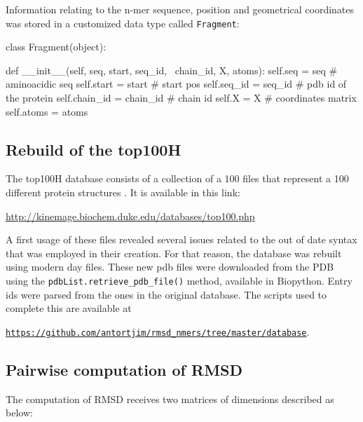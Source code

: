 \documentclass[a4paper, 11pt]{article} %
\begin{document}
Information relating to the n-mer sequence, position and geometrical coordinates was stored in a customized data type called \texttt{Fragment}:


\lstset{language=Python}          %

\begin{python}
class Fragment(object):

    def __init__(self, seq, start, seq_id, \
    chain_id, X, atoms):
        self.seq = seq           # aminoacidic seq
        self.start = start       # start pos
        self.seq_id = seq_id     # pdb id of the protein
        self.chain_id = chain_id # chain id
        self.X = X               # coordinates matrix
        self.atoms = atoms
\end{python}





\subsection{Rebuild of the top100H}

The top100H database consists of a collection of a 100 files that represent a 100 different protein structures \cite{top100}. It is available in this link:

\color{blue}
\href{http://kinemage.biochem.duke.edu/databases/top100.php}{http://kinemage.biochem.duke.edu/databases/top100.php}
\color{black}

A first usage of these files revealed several issues related to the out of date syntax that was employed in their creation. For that reason, the database was rebuilt using modern day files.
These new pdb files were downloaded from the PDB \cite{pdb} using the \texttt{pdbList.retrieve\_pdb\_file()} method, available in Biopython. Entry ids were parsed from the ones in the original database. The scripts used to complete this are available at

\texttt{\href{https://github.com/antortjim/rmsd\_nmers/tree/master/database}{https://github.com/antortjim/rmsd\_nmers/tree/master/database}}.


\subsection{Pairwise computation of RMSD}

The computation of RMSD \cite{rmsd} receives two matrices of dimensions described as below:
\end{document}
